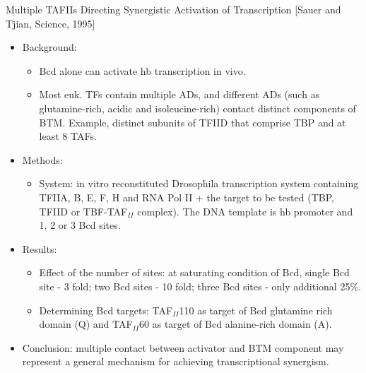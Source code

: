 \documentclass{report}
\begin{document}
Multiple TAFIIs Directing Synergistic Activation of Transcription [Sauer and Tjian, Science, 1995]
\begin{itemize}
	\item Background: 
	\begin{itemize}
		\item Bcd alone can activate hb transcription in vivo. 
		\item Most euk. TFs contain multiple ADs, and different ADs (such as glutamine-rich, acidic and isoleucine-rich) contact distinct components of BTM. Example, distinct subunits of TFIID that comprise TBP and at least 8 TAFs. 
	\end{itemize}
	
	\item Methods: 
	\begin{itemize}
		\item System: in vitro reconstituted Drosophila transcription system containing TFIIA, B, E, F, H and RNA Pol II + the target to be tested (TBP, TFIID or TBF-TAF$_{II}$ complex). The DNA template is hb promoter and 1, 2 or 3 Bcd sites. 
	\end{itemize}
	
	\item Results: 
	\begin{itemize}
		\item Effect of the number of sites: at saturating condition of Bcd, single Bcd site - 3 fold; two Bcd sites - 10 fold; three Bcd sites - only additional 25\%. 
		\item Determining Bcd targets: TAF$_{II}$110 as target of Bcd glutamine rich domain (Q) and TAF$_{II}$60 as target of Bcd alanine-rich domain (A). 
	\end{itemize}
	
	\item Conclusion: multiple contact between activator and BTM component may represent a general mechanism for achieving transcriptional synergism. 
\end{itemize}
\end{document}
